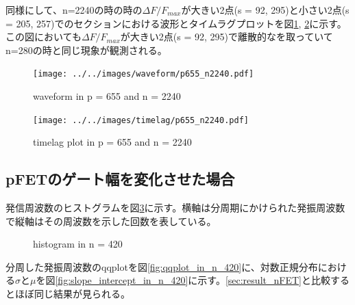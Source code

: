 \documentclass{jsarticle}
\begin{document}
同様にして、n=2240の時の時の$\Delta F / F_{max}$が大きい2点(s = 92, 295)と小さい2点(s = 205, 257)でのセクションにおける波形とタイムラグプロットを図\ref{fig:waveform_in_p_655_n_2240}, \ref{fig:timelag_in_p_655_n_2240}に示す。この図においても$\Delta F / F_{max}$が大きい2点(s = 92, 295)で離散的なを取っていてn=280の時と同じ現象が観測される。

\begin{figure}[hbtp]
	\centering
	\texttt{[image: ../../images/waveform/p655\_n2240.pdf]}
	\caption{waveform in p = 655 and n = 2240}
	\label{fig:waveform_in_p_655_n_2240}
\end{figure}

\begin{figure}[hbtp]
	\centering
	\texttt{[image: ../../images/timelag/p655\_n2240.pdf]}
	\caption{timelag plot in p = 655 and n = 2240}
	\label{fig:timelag_in_p_655_n_2240}
\end{figure}

\subsection{pFETのゲート幅を変化させた場合}
\label{sec:result_pFET}

発信周波数のヒストグラムを図\ref{fig:histogram_in_n_420}に示す。横軸は分周期にかけられた発振周波数で縦軸はその周波数を示した回数を表している。

\begin{figure}[hbtp]
	\centering
	\caption{histogram in n = 420}
	\label{fig:histogram_in_n_420}
\end{figure}

分周した発振周波数のqqplotを図\ref{fig:qqplot_in_n_420}に、対数正規分布における$\sigma$と$\mu$を図\ref{fig:slope_intercept_in_n_420}に示す。\ref{sec:result_nFET}と比較するとほぼ同じ結果が見られる。
\end{document}
